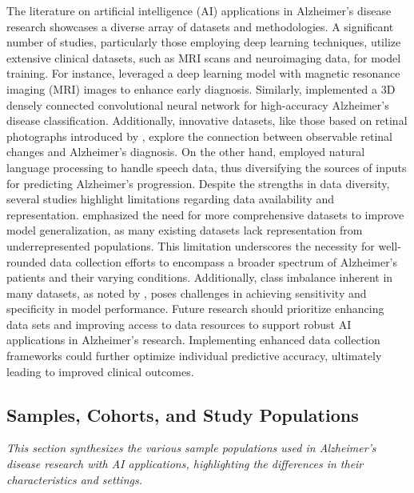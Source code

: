 \documentclass{MITcsail}
\begin{document}
The literature on artificial intelligence (AI) applications in Alzheimer's disease research showcases a diverse array of datasets and methodologies. A significant number of studies, particularly those employing deep learning techniques, utilize extensive clinical datasets, such as MRI scans and neuroimaging data, for model training. For instance, \citet{ref_10_1109_access_2021_3090474} leveraged a deep learning model with magnetic resonance imaging (MRI) images to enhance early diagnosis. Similarly, \citet{ref_10_1016_j_mri_2021_02_001} implemented a 3D densely connected convolutional neural network for high-accuracy Alzheimer's disease classification. Additionally, innovative datasets, like those based on retinal photographs introduced by \citet{ref_10_1016_s2589_7500_22_00169_8}, explore the connection between observable retinal changes and Alzheimer's diagnosis. On the other hand, \citet{ref_10_3389_fpubh_2022_772592} employed natural language processing to handle speech data, thus diversifying the sources of inputs for predicting Alzheimer's progression. Despite the strengths in data diversity, several studies highlight limitations regarding data availability and representation. \citet{ref_10_1002_alz_13390} emphasized the need for more comprehensive datasets to improve model generalization, as many existing datasets lack representation from underrepresented populations. This limitation underscores the necessity for well-rounded data collection efforts to encompass a broader spectrum of Alzheimer's patients and their varying conditions. Additionally, class imbalance inherent in many datasets, as noted by \citet{ref_10_1109_access_2021_3090474}, poses challenges in achieving sensitivity and specificity in model performance. Future research should prioritize enhancing data sets and improving access to data resources to support robust AI applications in Alzheimer's research. Implementing enhanced data collection frameworks could further optimize individual predictive accuracy, ultimately leading to improved clinical outcomes.

\subsection{Samples, Cohorts, and Study Populations}

\textit{This section synthesizes the various sample populations used in Alzheimer's disease research with AI applications, highlighting the differences in their characteristics and settings.}
\end{document}
